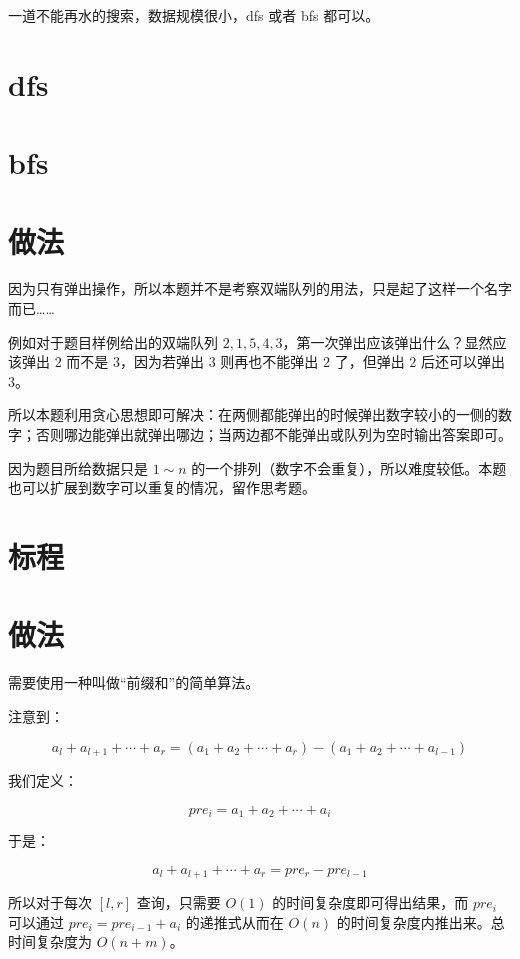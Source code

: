 \documentclass{../cpct/ctsol}
\begin{document}
一道不能再水的搜索，数据规模很小，dfs 或者 bfs 都可以。

\section*{dfs}


\section*{bfs}


\makesolution
\section*{做法}

因为只有弹出操作，所以本题并不是考察双端队列的用法，只是起了这样一个名字而已……

例如对于题目样例给出的双端队列 $2,1,5,4,3$，第一次弹出应该弹出什么？显然应该弹出 $2$ 而不是 $3$，因为若弹出 $3$ 则再也不能弹出 $2$ 了，但弹出 $2$ 后还可以弹出 $3$。

所以本题利用贪心思想即可解决：在两侧都能弹出的时候弹出数字较小的一侧的数字；否则哪边能弹出就弹出哪边；当两边都不能弹出或队列为空时输出答案即可。

因为题目所给数据只是 $1 \sim n$ 的一个排列（数字不会重复），所以难度较低。本题也可以扩展到数字可以重复的情况，留作思考题。

\section*{标程}


\makesolution
\section*{做法}

需要使用一种叫做“前缀和”的简单算法。

注意到：

$$a_l+a_{l+1}+ \cdots + a_r = (a_1 + a_2 + \cdots + a_r) - (a_1 + a_2 + \cdots + a_{l-1})$$

我们定义：

$$pre_i = a_1 + a_2 + \cdots + a_i$$

于是：

$$a_l+a_{l+1}+ \cdots + a_r = pre_r - pre_{l-1}$$

所以对于每次 $[l,r]$ 查询，只需要 $O(1)$ 的时间复杂度即可得出结果，而 $pre_i$ 可以通过 $pre_i = pre_{i-1} + a_i$ 的递推式从而在 $O(n)$ 的时间复杂度内推出来。总时间复杂度为 $O(n+m)$。
\end{document}
